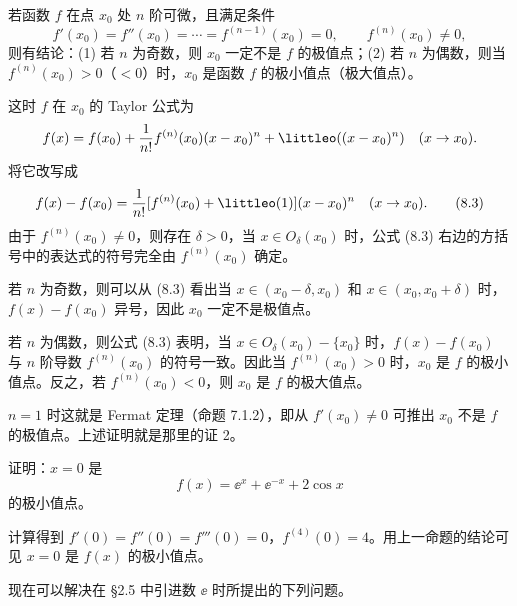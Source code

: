 \begin{xexample}[8.3.1]
若函数 $f$ 在点 $x_0$ 处 $n$ 阶可微，且满足条件
\[
  f'(x_0)=f''(x_0)=\cdots=f^{(n-1)}(x_0)=0,\qquad f^{(n)}(x_0)\ne0,
\]
则有结论：(1) 若 $n$ 为奇数，则 $x_0$ 一定不是 $f$ 的极值点；(2) 若 $n$ 为偶数，则当 $f^{(n)}(x_0)>0$（$<0$）时，$x_0$ 是函数 $f$ 的极小值点（极大值点）。
\end{xexample}
\begin{xproof}
这时 $f$ 在 $x_0$ 的 Taylor 公式为
\[
  f(x)=f(x_0)+\frac1{n!}f^{(n)}(x_0)(x-x_0)^n+\littleo((x-x_0)^n)\quad(x\to x_0).
\]
将它改写成
\begin{equation}
  f(x)-f(x_0)=\frac1{n!}[f^{(n)}(x_0)+\littleo(1)](x-x_0)^n\quad(x\to x_0).
  \tag{8.3}
  \label{eq:8.3}
\end{equation}
由于 $f^{(n)}(x_0)\ne0$，则存在 $\delta>0$，当 $x\in O_\delta(x_0)$ 时，公式 (8.3) 右边的方括号中的表达式的符号完全由 $f^{(n)}(x_0)$ 确定。

若 $n$ 为奇数，则可以从 (8.3) 看出当 $x\in(x_0-\delta,x_0)$ 和 $x\in(x_0,x_0+\delta)$ 时，$f(x)-f(x_0)$ 异号，因此 $x_0$ 一定不是极值点。

若 $n$ 为偶数，则公式 (8.3) 表明，当 $x\in O_\delta(x_0)-\{x_0\}$ 时，$f(x)-f(x_0)$ 与 $n$ 阶导数 $f^{(n)}(x_0)$ 的符号一致。因此当 $f^{(n)}(x_0)>0$ 时，$x_0$ 是 $f$ 的极小值点。反之，若 $f^{(n)}(x_0)<0$，则 $x_0$ 是 $f$ 的极大值点。
\end{xproof}

\begin{xremark}
$n=1$ 时这就是 Fermat 定理（命题 7.1.2），即从 $f'(x_0)\ne0$ 可推出 $x_0$ 不是 $f$ 的极值点。上述证明就是那里的证 2。
\end{xremark}

\begin{xexample}[8.3.2]
证明：$x=0$ 是
\[
  f(x)=\ee^x+\ee^{-x}+2\cos x
\]
的极小值点。
\end{xexample}
\begin{xproof}
计算得到 $f'(0)=f''(0)=f'''(0)=0$，$f^{(4)}(0)=4$。用上一命题的结论可见 $x=0$ 是 $f(x)$ 的极小值点。
\end{xproof}

现在可以解决在 §2.5 中引进数 $\ee$ 时所提出的下列问题。


